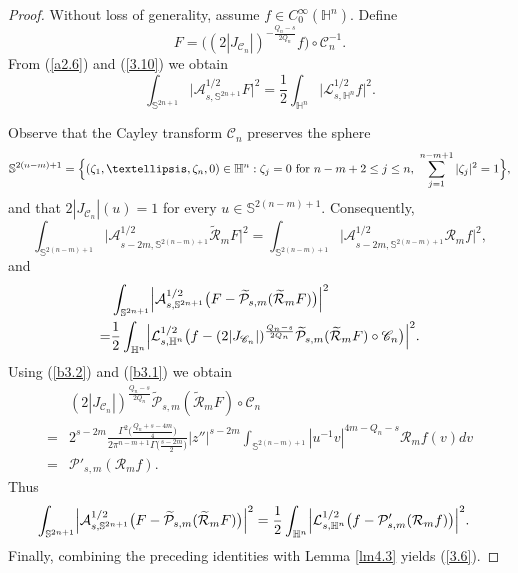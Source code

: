 \documentclass[10pt,a4paper]{amsart}
\begin{document}
\begin{proof}
Without loss of generality, assume \(f \in C_{0}^{\infty}(\mathbb{H}^{n})\).
Define
\[
F = \bigl( (2|J_{\mathscr{C}_{n}}|)^{-\frac{Q_n-s}{2Q_n}} f \bigr)\circ\mathscr{C}_{n}^{-1}.
\]
From (\ref{a2.6}) and (\ref{3.10}) we obtain
\[
\int_{\mathbb{S}^{2n+1}} \bigl|\mathcal{A}_{s,\mathbb{S}^{2n+1}}^{1/2} F\bigr|^{2}
= \frac{1}{2}\int_{\mathbb{H}^{n}} \bigl|\mathcal{L}_{s,\mathbb{H}^{n}}^{1/2} f\bigr|^{2}.
\]

Observe that the Cayley transform \(\mathscr{C}_{n}\) preserves the sphere
\[
\mathbb{S}^{2(n-m)+1} = \Bigl\{(\zeta_{1},\dots,\zeta_{n}, 0)\in \mathbb{H}^{n} :
\zeta_{j}=0 \text{ for } n-m+2 \leq j \leq n,\
\sum_{j=1}^{n-m+1}|\zeta_{j}|^{2}=1 \Bigr\},
\]
and that \(2|J_{\mathscr{C}_{n}}|(u)=1\) for every \(u \in \mathbb{S}^{2(n-m)+1}\). Consequently,
\[
\int_{\mathbb{S}^{2(n-m)+1}} \bigl|\mathcal{A}_{s-2m,\mathbb{S}^{2(n-m)+1}}^{1/2}
\widetilde{\mathcal{R}}_{m}F\bigr|^{2}
= \int_{\mathbb{S}^{2(n-m)+1}} \bigl|\mathcal{A}_{s-2m,\mathbb{S}^{2(n-m)+1}}^{1/2}
\mathcal{R}_{m}f\bigr|^{2},
\]
and
\begin{align*}
&\int_{\mathbb{S}^{2n+1}} \Bigl|\mathcal{A}_{s,\mathbb{S}^{2n+1}}^{1/2}\bigl(F-
\widetilde{\mathcal{P}}_{s,m}(\widetilde{\mathcal{R}}_{m}F)\bigr)\Bigr|^{2}\\
=& \frac{1}{2}
\int_{\mathbb{H}^{n}} \Bigl|\mathcal{L}_{s,\mathbb{H}^{n}}^{1/2}\bigl(f - (2|J_{\mathscr{C}_{n}}|)^{\frac{Q_n-s}{2Q_n}}\widetilde{\mathcal{P}}_{s,m}(\widetilde{\mathcal{R}}_{m}F)\circ\mathscr{C}_n\bigr)\Bigr|^{2}.
\end{align*}
Using (\ref{b3.2}) and (\ref{b3.1}) we obtain
\begin{align*}
&(2|J_{\mathscr{C}_{n}}|)^{\frac{Q_n-s}{2Q_n}}\widetilde{\mathcal{P}}_{s,m}(\widetilde{\mathcal{R}}_{m}F)\circ\mathscr{C}_n \\
=& 2^{s-2m}
\frac{\Gamma^{2}\bigl(\frac{Q_n+s-4m}{4}\bigr)}
{2\pi^{n-m+1}\Gamma\bigl(\frac{s-2m}{2}\bigr)}
|z''|^{s-2m}\int_{\mathbb{S}^{2(n-m)+1}} |u^{-1}v|^{4m-Q_n-s}\mathcal{R}_{m}f(v)dv \\
=& \mathcal{P}'_{s,m}(\mathcal{R}_{m}f).
\end{align*}
Thus
\begin{align*}
&\int_{\mathbb{S}^{2n+1}} \Bigl|\mathcal{A}_{s,\mathbb{S}^{2n+1}}^{1/2}\bigl(F-
\widetilde{\mathcal{P}}_{s,m}(\widetilde{\mathcal{R}}_{m}F)\bigr)\Bigr|^{2}= \frac{1}{2}
\int_{\mathbb{H}^{n}} \Bigl|\mathcal{L}_{s,\mathbb{H}^{n}}^{1/2}\bigl(f - \mathcal{P}'_{s,m}(\mathcal{R}_{m}f)\bigr)\Bigr|^{2}.
\end{align*}
Finally, combining the preceding identities with Lemma \ref{lm4.3} yields (\ref{3.6}).
\end{proof}
\end{document}
